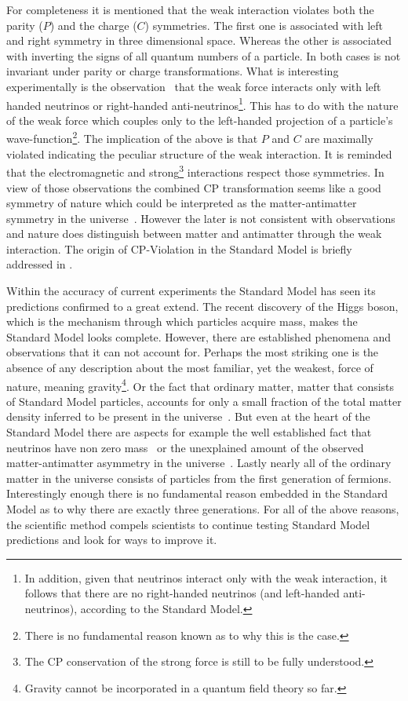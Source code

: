 For completeness it is mentioned that the weak interaction violates both the parity ($P$) and the charge ($C$) symmetries.
The first one is associated with left and right symmetry in three dimensional space. Whereas the other is associated with inverting the signs of all quantum numbers of a particle.
In both cases  is not invariant under parity or charge transformations. What is interesting experimentally
is the observation~\cite{wu-parity,garwin-parity} that the weak force interacts only with left handed neutrinos or right-handed
anti-neutrinos\footnote{In addition, given that neutrinos interact only with the weak interaction, it follows that there are no
right-handed neutrinos (and left-handed anti-neutrinos), according to the Standard Model.}. This has to do with the nature of
the weak force which couples only to the left-handed projection of a particle's
wave-function\footnote{There is no fundamental reason known as to why this is the case.}. The implication of the above is that
$P$ and $C$ are maximally violated indicating the peculiar structure of the weak interaction. It is reminded that
the electromagnetic and strong\footnote{The CP conservation of the strong force is still to be fully understood.} interactions respect those symmetries. In view of those observations the combined CP transformation
seems like a good symmetry of nature which could be interpreted as the matter-antimatter symmetry in the universe~\cite{Sakharov:1967dj}.
However the later is not consistent with observations and nature does distinguish between matter and antimatter through
the weak interaction. The origin of CP-Violation in the Standard Model is briefly addressed in .

Within the accuracy of current experiments the Standard Model has seen its predictions confirmed to a great extend.
The recent discovery of the Higgs boson, which is the mechanism through which particles acquire mass, makes the Standard Model looks
complete. However, there are established phenomena and observations that it can not
account for. Perhaps the most striking one is the absence of any description about the most familiar, yet the weakest, force of nature,
meaning gravity\footnote{Gravity cannot be incorporated in a quantum field theory so far.}.
Or the fact that ordinary matter, \ie matter that consists of Standard Model particles, accounts for only a small
fraction of the total matter density inferred to be present in the universe~\cite{dmatter-Hinshaw}. But even at the heart
of the Standard Model there are aspects for example the well established fact that neutrinos have non zero
mass~\cite{nu-mass-superkam,nu-mass-kamland,nu-mass-sno,nu-mass-daya} or the unexplained amount of the observed
matter-antimatter asymmetry in the universe~\cite{more-cpv-huet,more-cpv-gavela_I,more-cpv-gavela_II}.
Lastly nearly all of the ordinary matter in the universe consists of
particles from the first generation of fermions. Interestingly enough there is no fundamental reason embedded in the Standard Model
as to why there are exactly three generations. For all of the above reasons, the scientific method compels scientists to continue
testing Standard Model predictions and look for ways to improve it.
